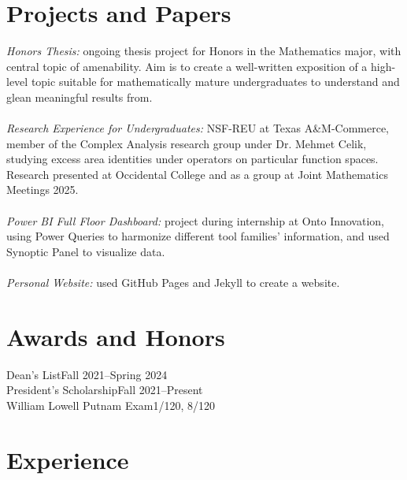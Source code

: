 \documentclass[margin, 12pt]{res} %
\begin{document}
\begin{resume}
\section{\sc Projects and Papers}
{\sl Honors Thesis:} ongoing thesis project for Honors in the Mathematics major, with central topic of amenability. Aim is to create a well-written exposition of a high-level topic suitable for mathematically mature undergraduates to understand and glean meaningful results from.\\
\vspace{4pt}\\
{\sl Research Experience for Undergraduates:} NSF-REU at Texas A\&M-Commerce, member of the Complex Analysis research group under Dr. Mehmet Celik, studying excess area identities under operators on particular function spaces. Research presented at Occidental College and as a group at Joint Mathematics Meetings 2025.\\
\vspace{4pt}\\
{\sl Power BI Full Floor Dashboard:} project during internship at Onto Innovation, using Power Queries to harmonize different tool families' information, and used Synoptic Panel to visualize data.\\
\vspace{4pt}\\
{\sl Personal Website:} used GitHub Pages and Jekyll to create a website.\\

\section{\sc Awards and Honors}
Dean's List\hfill Fall 2021--Spring 2024\\
President's Scholarship\hfill Fall 2021--Present\\
William Lowell Putnam Exam\hfill 1/120, 8/120

\section{\sc Experience}


\end{resume}
\end{document}
